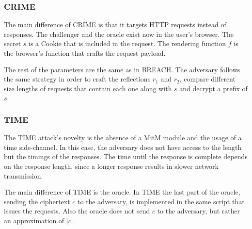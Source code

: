 \subsubsection{CRIME}
The main difference of CRIME is that it targets HTTP requests instead of
responses. The challenger and the oracle exist now in the user's browser. The
secret $s$ is a Cookie that is included in the request. The rendering function
$f$ is the browser's function that crafts the request payload.

The rest of the parameters are the same as in BREACH. The adversary follows the
same strategy in order to craft the reflections $r_1$ and $r_2$, compare
different size lengths of requests that contain each one along with $s$ and
decrypt a prefix of $s$.

\subsubsection{TIME}
The TIME attack's novelty is the absence of a MitM module and the usage of a
time side-channel. In this case, the adversary does not have access to the
length but the timings of the responses. The time until the response is complete
depends on the response length, since a longer response results in slower
network transmission.

The main difference of TIME is the oracle. In TIME the last part of the
oracle, sending the ciphertext $c$ to the adversary, is implemented in the same
script that issues the requests. Also the oracle does not send $c$ to the
adversary, but rather an approximation of $\rvert c \rvert$.
